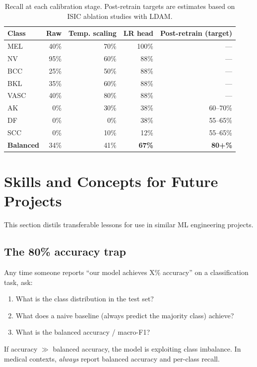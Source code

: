 \documentclass[12pt,a4paper]{article}
\begin{document}
\begin{table}[h]
\centering
\begin{tabular}{lrrrr}
\toprule
\textbf{Class} & \textbf{Raw} & \textbf{Temp. scaling} & \textbf{LR head} & \textbf{Post-retrain (target)} \\
\midrule
MEL   & 40\%  & 70\%  & 100\% & --- \\
NV    & 95\%  & 60\%  & 88\%  & --- \\
BCC   & 25\%  & 50\%  & 88\%  & --- \\
BKL   & 35\%  & 60\%  & 88\%  & --- \\
VASC  & 40\%  & 80\%  & 88\%  & --- \\
AK    & 0\%   & 30\%  & 38\%  & 60--70\% \\
DF    & 0\%   & 0\%   & 38\%  & 55--65\% \\
SCC   & 0\%   & 10\%  & 12\%  & 55--65\% \\
\midrule
\textbf{Balanced} & 34\% & 41\% & \textbf{67\%} & \textbf{80+\%} \\
\bottomrule
\end{tabular}
\caption{Recall at each calibration stage. Post-retrain targets are estimates based on ISIC ablation studies with LDAM.}
\end{table}

\section{Skills and Concepts for Future Projects}

This section distils transferable lessons for use in similar ML engineering projects.

\subsection{The 80\% accuracy trap}

Any time someone reports ``our model achieves X\% accuracy'' on a classification task, ask:
\begin{enumerate}
  \item What is the class distribution in the test set?
  \item What does a naive baseline (always predict the majority class) achieve?
  \item What is the balanced accuracy / macro-F1?
\end{enumerate}
If accuracy $\gg$ balanced accuracy, the model is exploiting class imbalance. In medical
contexts, \emph{always} report balanced accuracy and per-class recall.
\end{document}
